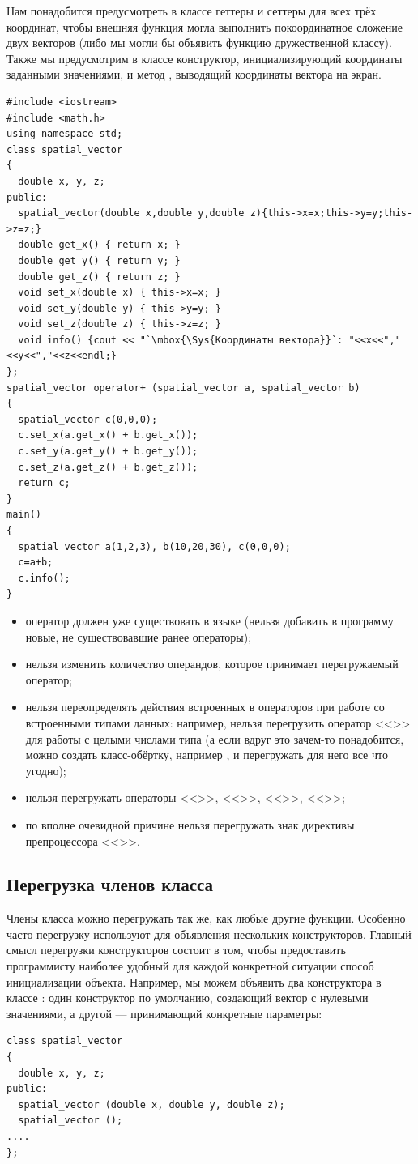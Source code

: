Нам понадобится предусмотреть в классе 
геттеры и сеттеры для всех трёх координат,  чтобы внешняя функция могла выполнить покоординатное сложение двух векторов
(либо мы могли бы объявить функцию дружественной классу). Также мы предусмотрим в классе конструктор, инициализирующий
координаты заданными значениями, и метод , выводящий координаты вектора
на экран. 
\begin{lstlisting}
#include <iostream>
#include <math.h>
using namespace std;
class spatial_vector 
{
  double x, y, z;
public:
  spatial_vector(double x,double y,double z){this->x=x;this->y=y;this->z=z;}
  double get_x() { return x; }
  double get_y() { return y; }
  double get_z() { return z; }
  void set_x(double x) { this->x=x; }
  void set_y(double y) { this->y=y; }
  void set_z(double z) { this->z=z; }
  void info() {cout << "`\mbox{\Sys{Координаты вектора}}`: "<<x<<","<<y<<","<<z<<endl;}
};
spatial_vector operator+ (spatial_vector a, spatial_vector b) 
{
  spatial_vector c(0,0,0);
  c.set_x(a.get_x() + b.get_x());
  c.set_y(a.get_y() + b.get_y());
  c.set_z(a.get_z() + b.get_z());
  return c;
}
main() 
{
  spatial_vector a(1,2,3), b(10,20,30), c(0,0,0);
  c=a+b;
  c.info();
}
\end{lstlisting}

\begin{itemize}
\item оператор должен уже существовать в языке (нельзя добавить в программу новые, не существовавшие ранее операторы);
\item нельзя изменить количество операндов, которое принимает перегружаемый оператор;
\item нельзя переопределять действия встроенных в  операторов при работе со встроенными типами данных: например,
нельзя перегрузить оператор <<\Sys{+}>> для работы с целыми числами типа  (а
если вдруг это зачем-то понадобится, можно создать класс-обёртку, например 
, и перегружать для него все что угодно);
\item нельзя перегружать операторы <<>>, <<>>,
<<>>, <<\Sys{::}>>;
\item по вполне очевидной причине нельзя перегружать знак директивы препроцессора <<\Sys{\#}>>.
\end{itemize}
\subsection[Перегрузка членов класса]{Перегрузка членов класса}
Члены класса можно перегружать так же, как любые другие функции. Особенно часто перегрузку используют для объявления
нескольких конструкторов. Главный смысл перегрузки конструкторов состоит в том, чтобы предоставить программисту
наиболее удобный для каждой конкретной ситуации способ инициализации объекта. Например, мы можем объявить два
конструктора в классе : один конструктор по умолчанию, создающий вектор с нулевыми
значениями, а другой --- принимающий конкретные параметры:
\begin{lstlisting}
class spatial_vector 
{
  double x, y, z;
public:
  spatial_vector (double x, double y, double z);
  spatial_vector ();
....
};
\end{lstlisting}

